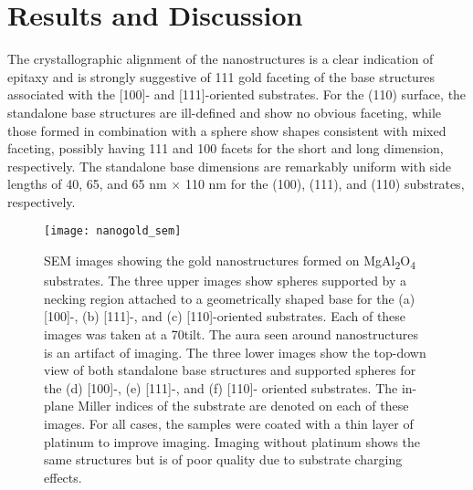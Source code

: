 \section{Results and Discussion}
The crystallographic alignment of
the nanostructures is a clear indication of epitaxy and
is strongly suggestive of {111} gold faceting of the base
structures associated with the [100]- and [111]-oriented
substrates. For the (110) surface, the standalone base
structures are ill-defined and show no obvious faceting, while
those formed in combination with a sphere show shapes
consistent with mixed faceting, possibly having {111} and
{100} facets for the short and long dimension, respectively.
The standalone base dimensions are remarkably uniform with
side lengths of 40, 65, and 65 nm $\times$ 110 nm for the (100),
(111), and (110) substrates, respectively.
\begin{figure}
    \centering
    \texttt{[image: nanogold\_sem]}
    \caption{\label{fig:nanogold_sem}SEM images showing the gold nanostructures formed
        on MgAl\textsubscript{2}O\textsubscript{4} substrates. The three upper images show spheres
        supported by a necking region attached to a geometrically shaped
        base for the (a) [100]-, (b) [111]-, and (c) [110]-oriented substrates.
        Each of these images was taken at a 70\degree tilt. The aura seen around
        nanostructures is an artifact of imaging. The three lower images
        show the top-down view of both standalone base structures and
        supported spheres for the (d) [100]-, (e) [111]-, and (f) [110]-
        oriented substrates. The in-plane Miller indices of the substrate are
        denoted on each of these images. For all cases, the samples were
        coated with a thin layer of platinum to improve imaging. Imaging
        without platinum shows the same structures but is of poor quality
        due to substrate charging effects.}
\end{figure}

